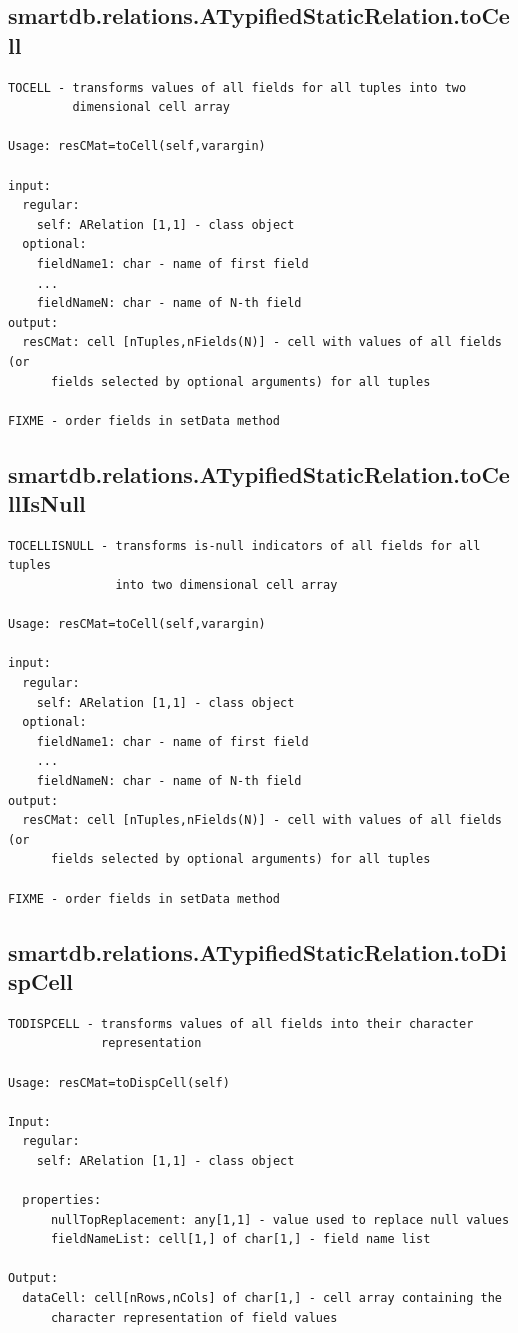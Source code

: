 \documentclass[letterpaper,10pt,english]{sphinxmanual}
\begin{document}
\subsection{smartdb.relations.ATypifiedStaticRelation.toCell}
\label{chap_functions:smartdb-relations-atypifiedstaticrelation-tocell}
\begin{Verbatim}[commandchars=\\\{\}]
TOCELL - transforms values of all fields for all tuples into two
         dimensional cell array

Usage: resCMat=toCell(self,varargin)

input:
  regular:
    self: ARelation [1,1] - class object
  optional:
    fieldName1: char - name of first field
    ...
    fieldNameN: char - name of N-th field
output:
  resCMat: cell [nTuples,nFields(N)] - cell with values of all fields (or
      fields selected by optional arguments) for all tuples

FIXME - order fields in setData method
\end{Verbatim}


\subsection{smartdb.relations.ATypifiedStaticRelation.toCellIsNull}
\label{chap_functions:smartdb-relations-atypifiedstaticrelation-tocellisnull}
\begin{Verbatim}[commandchars=\\\{\}]
TOCELLISNULL - transforms is-null indicators of all fields for all tuples
               into two dimensional cell array

Usage: resCMat=toCell(self,varargin)

input:
  regular:
    self: ARelation [1,1] - class object
  optional:
    fieldName1: char - name of first field
    ...
    fieldNameN: char - name of N-th field
output:
  resCMat: cell [nTuples,nFields(N)] - cell with values of all fields (or
      fields selected by optional arguments) for all tuples

FIXME - order fields in setData method
\end{Verbatim}


\subsection{smartdb.relations.ATypifiedStaticRelation.toDispCell}
\label{chap_functions:smartdb-relations-atypifiedstaticrelation-todispcell}
\begin{Verbatim}[commandchars=\\\{\}]
TODISPCELL - transforms values of all fields into their character
             representation

Usage: resCMat=toDispCell(self)

Input:
  regular:
    self: ARelation [1,1] - class object

  properties:
      nullTopReplacement: any[1,1] - value used to replace null values
      fieldNameList: cell[1,] of char[1,] - field name list

Output:
  dataCell: cell[nRows,nCols] of char[1,] - cell array containing the
      character representation of field values
\end{Verbatim}
\end{document}
